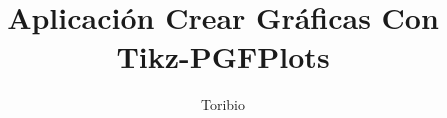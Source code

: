 \newcommand{\planoCartesiano}[4]{%
	\begin{tikzpicture}
		\begin{scope}[on background layer]
			\fill[#1] (-#3,-#4) rectangle (#3,#4);
		\end{scope}
		
		\begin{scope}
			\draw[step=.25, draw = #2!25, line width =.3pt] (-#3,-#4) grid (#3,#4);  
			\draw[<->, >=Stealth, ultra thick, #2] (0,-#4) -- (0,#4) ; 
			\draw[<->, >=Stealth, ultra thick, #2] (-#3,0) -- (#3,0) ;
			
			\foreach \x in {1,2,...,#3}
			{
				\draw[black, thick] (\x,-0.1) -- (\x,0.1);
				\node[black, below] at (\x,-0.3) {\x};
			}
			
			\foreach \x in {-1,-2,...,-#3}
			{
				\draw[black, thick] (\x,-0.1) -- (\x,0.1);
				\node[black, below] at (\x,-0.3) {\x};
			}
			
			\foreach \y in {1,2,...,#4}
			{
				\draw[black, thick] (-0.1,\y) -- (0.1,\y);
				\node[black, left] at (-0.3,\y) {\y};
			}
			
			\foreach \y in {-1,-2,...,-#4}
			{
				\draw[black, thick] (-0.1,\y) -- (0.1,\y);
				\node[black, left] at (-0.3,\y) {\y};
			}
			
			\draw[step=1, draw = #2!50, line width =.5pt] (-#3,-#4) grid (#3,#4);
			
		\end{scope}
	\end{tikzpicture}
}

\title{Aplicación Crear Gráficas Con Tikz-PGFPlots}
\author{Toribio}


\usepackage{syntonly}

